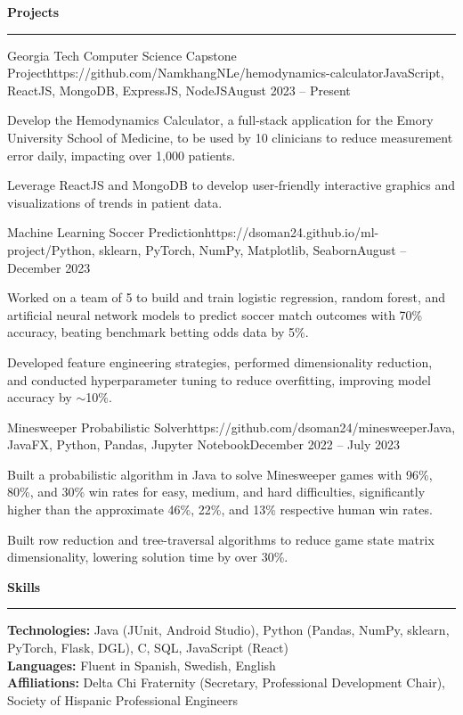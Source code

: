 \documentclass{article}
\newcommand{\horizontal}{\vspace{2pt}\hrule}
\newcommand{\sectitle}[1]{\vspace{3pt} \textbf{\large #1} \horizontal}
\newcommand{\skill}[2]{\textbf{#1:} #2}
\begin{document}
\begin{flushleft}
\sectitle{Projects}

    \vspace{3pt}

    \begin{project}{Georgia Tech Computer Science Capstone Project}{https://github.com/NamkhangNLe/hemodynamics-calculator}{JavaScript, ReactJS, MongoDB, ExpressJS, NodeJS}{August 2023 -- Present}
        \item Develop the Hemodynamics Calculator, a full-stack application for the Emory University School of Medicine, to be used by 10 clinicians to reduce measurement error daily, impacting over 1,000 patients.
        \item Leverage ReactJS and MongoDB to develop user-friendly interactive graphics and visualizations of trends in patient data.
    \end{project}

    \begin{project}{Machine Learning Soccer Prediction}{https://dsoman24.github.io/ml-project/}{Python, sklearn, PyTorch, NumPy, Matplotlib, Seaborn}{August -- December 2023}
        \item Worked on a team of 5 to build and train logistic regression, random forest, and artificial neural network models to predict soccer match outcomes with 70\% accuracy, beating benchmark betting odds data by 5\%.
        \item Developed feature engineering strategies, performed dimensionality reduction, and conducted hyperparameter tuning to reduce overfitting, improving model accuracy by $\sim$10\%.
    \end{project}

    \begin{project}{Minesweeper Probabilistic Solver}{https://github.com/dsoman24/minesweeper}{Java, JavaFX, Python, Pandas, Jupyter Notebook}{December 2022 -- July 2023}
        \item Built a probabilistic algorithm in Java to solve Minesweeper games with 96\%, 80\%, and 30\% win rates for easy, medium, and hard difficulties, significantly higher than the approximate 46\%, 22\%, and 13\% respective human win rates.
        \item Built row reduction and tree-traversal algorithms to reduce game state matrix dimensionality, lowering solution time by over 30\%.
    \end{project}

\sectitle{Skills}

    \vspace{3pt}
    \skill{Technologies}{Java (JUnit, Android Studio), Python (Pandas, NumPy, sklearn, PyTorch, Flask, DGL), C, SQL, JavaScript (React)} \\
    \skill{Languages}{Fluent in Spanish, Swedish, English} \\
    \skill{Affiliations}{Delta Chi Fraternity (Secretary, Professional Development Chair), Society of Hispanic Professional Engineers}

\end{flushleft}
\end{document}
